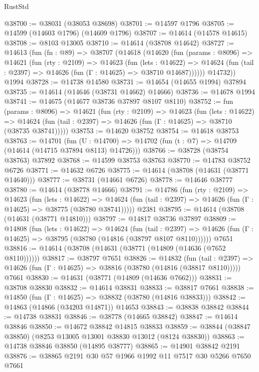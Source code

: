 \begin{lexlean}{RustStd}
\begin{coremodule}
@38700 := @38031 (@38053 @38698)
@38701 := @14597 @1796
@38705 := @14599 (@14603 @1796) (@14609 @1796)
@38707 := @14614 (@14578 @14615)
@38708 := @8103 @13005
@38710 := @14614 (@38708 @14642)
@38727 := @14613
    (fun (fn : @89) =>
    @38707
      (@14618
        (@14620
          (fun (params : @8096) =>
          @14621
            (fun (rty : @2109) =>
            @14623
              (fun (lets : @14622) =>
              @14624 (fun (tail : @2397) => @14626 (fun (Γ : @14625) => @38710 @14687))))))
        @14732))
    @1994
@38728 := @14738 @14580
@38731 := @14654 (@14655 @1994) @37894
@38735 := @14614 (@14646 (@38731 @14662) @14666)
@38736 := @14678 @1994
@38741 := @14675 (@14677 @38736 @37897 @8107 @8110)
@38752 := fun (params : @8096) =>
  @14621
    (fun (rty : @2109) =>
    @14623
      (fun (lets : @14622) =>
      @14624 (fun (tail : @2397) => @14626 (fun (Γ : @14625) => @38710 (@38735 @38741)))))
@38753 := @14620 @38752
@38754 := @14618 @38753
@38763 := @14701
    (fun (U : @14700) => @14702 (fun (t : @7) => @14709 (@14614 (@14715 @37894 @8113) @14726)))
@38766 := @38728 (@38754 @38763) @37892
@38768 := @14599 @38753 @38763
@38770 := @14783 @38752 @6726
@38771 := @14632 @6726
@38775 := @14614 (@38708 (@14631 (@38771 @14640)))
@38777 := @38731 (@14661 @6726)
@38778 := @14646 @38777
@38780 := @14614 (@38778 @14666)
@38791 := @14786
    (fun (rty : @2109) =>
    @14623
      (fun (lets : @14622) =>
      @14624 (fun (tail : @2397) => @14626 (fun (Γ : @14625) => @38775 (@38780 @38741)))))
    @2381
@38795 := @14614 (@38708 (@14631 (@38771 @14810)))
@38797 := @14817 @38736 @37897
@38809 := @14808
    (fun (lets : @14622) =>
    @14624
      (fun (tail : @2397) =>
      @14626 (fun (Γ : @14625) => @38795 (@38780 (@14816 (@38797 @8107 @8110))))))
    @7651
@38816 := @14614 (@38708 (@14631 (@38771 (@14809 (@14636 (@7652 @8110))))))
@38817 := @38797 @7651
@38826 := @14832
    (fun (tail : @2397) => @14626 (fun (Γ : @14625) => @38816 (@38780 (@14816 (@38817 @8110)))))
    @7661
@38830 := @14631 (@38771 (@14809 (@14636 @7662)))
@38831 := @38708 @38830
@38832 := @14614 @38831
@38833 := @38817 @7661
@38838 := @14850 (fun (Γ : @14625) => @38832 (@38780 (@14816 @38833)))
@38842 := @14863 (@14866 (@34203 @14871)) @14653
@38843 := @38838 @38842
@38844 := @14738 @38831
@38846 := @38778 (@14665 @38842)
@38847 := @14614 @38846
@38850 := @14672 @38842 @14815 @38833
@38859 := @38844 (@38847 @38850) (@8253 @13005 @13001 @38830 @13012 (@8124 @38830))
@38863 := @14738 @38846 @38850 (@14895 @38777)
@38865 := @14901 @38842 @2191
@38876 := @38865 @2191 @30 @57 @1966 @1992 @11 @7517 @30 @5266 @7650 @7661

\end{coremodule}
\end{lexlean}
